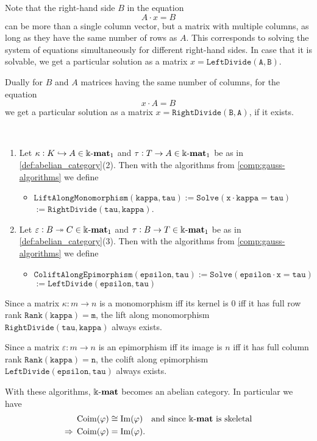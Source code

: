 Note that the right-hand side $B$ in the equation 
\[
A \cdot x = B
\]
can be more than a single column vector, but a matrix with multiple columns, as long as they have the same number of rows as $A$.
This corresponds to solving the system of equations simultaneously for different right-hand sides. In case that it is solvable,
we get a particular solution as a matrix $x = \mathtt{LeftDivide( A, B )}$.

Dually for $B$ and $A$ matrices having the same number of columns, for the equation
\[
x \cdot A = B
\]
we get a particular solution as a matrix $x = \mathtt{RightDivide( B, A )}$, if it exists.

\begin{example}\phantom{}\\
\begin{enumerate}
\renewcommand{\labelenumi}{(\theenumi)}
\item Let $\kappa : K \hookrightarrow A \in \Bbbk\textnormal{-}\mathbf{mat}_{1}$ and $\tau : T \rightarrow A \in \Bbbk\textnormal{-}\mathbf{mat}_{1}$ be as in
\ref{def:abelian_category}(2).
Then with the algorithms from \ref{comp:gauss-algorithms} we define
\begin{itemize}
\item $\mathtt{LiftAlongMonomorphism( kappa, tau ) := Solve( x \cdot kappa = tau )}$\\
$\mathtt{ := RightDivide( tau, kappa )}$.
\end{itemize}
\item Let $\varepsilon : B \twoheadrightarrow C \in \Bbbk\textnormal{-}\mathbf{mat}_{1}$ and $\tau : B \rightarrow T \in \Bbbk\textnormal{-}\mathbf{mat}_{1}$ be as in
\ref{def:abelian_category}(3).
Then with the algorithms from \ref{comp:gauss-algorithms} we define
\begin{itemize}
\item $\mathtt{ColiftAlongEpimorphism( epsilon, tau ) := Solve( epsilon \cdot x = tau )}$\\
$\mathtt{ := LeftDivide( epsilon, tau )}$
\end{itemize}
\end{enumerate}

Since a matrix $\kappa : m \rightarrow n$ is a monomorphism iff its kernel is $0$ iff it has full row rank $\mathtt{Rank(kappa) = m}$,
the lift along monomorphism $\mathtt{RightDivide( tau, kappa )}$ always exists.

Since a matrix $\varepsilon : m \rightarrow n$ is an epimorphism iff its image is $n$ iff it has full column rank
$\mathtt{Rank(kappa) = n}$, the colift along epimorphism $\mathtt{LeftDivide( epsilon, tau )}$ always exists.

With these algorithms, $\Bbbk\textnormal{-}\mathbf{mat}$ becomes an abelian category. In particular we have
\begin{align*}
\mathrm{Coim}(\varphi) &\cong \mathrm{Im}(\varphi)\quad\text{and since $\Bbbk\textnormal{-}\mathbf{mat}$ is skeletal}\\
\Rightarrow\, \mathrm{Coim}(\varphi) &=\mathrm{Im}(\varphi).
\end{align*}
\end{example}


